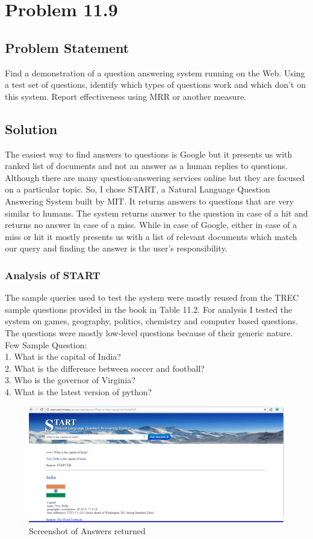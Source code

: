 \documentclass[12pt]{report}
\begin{document}
\chapter{Problem 11.9}
\section{Problem Statement}
Find a demonstration of a question answering system running on the Web. Using a test set of questions, identify which types of questions work and which don’t on this system. Report effectiveness using MRR or another measure.
\section{Solution}
The easiest way to find answers to questions is Google but it presents us with ranked list of documents and not an answer as a human replies to questions. Although there are many question-answering services online but they are focused on a particular topic. So, I chose START, a Natural Language Question Answering System built by MIT. It returns answers to questions that are very similar to humans. The system returns answer to the question in case of a hit and returns no answer in case of a miss. While in case of Google, either in case of a miss or hit it mostly presents us with a list of relevant documents  which match our query and finding the answer is the user's responsibility. 
\subsection{Analysis of START}
The sample queries used to test the system were mostly reused from the TREC sample questions provided in the book in Table 11.2. For analysis I tested the system on games, geography, politics, chemistry and computer based  questions. The questions were mostly low-level questions because of their generic nature.
Few Sample Question:\\
1. What is the capital of India?\\
2. What is the difference between soccer and football?\\
3. Who is the governor of Virginia?\\
4. What is the latest version of python?\\

\begin{figure}[ht]
  \centering
  \includegraphics[width=1\textwidth]{Problem11_9/Delhi.png}
  \caption{Screenshot of Answers returned}
  \label{fig:1}
\end{figure} 
 
\end{document}
